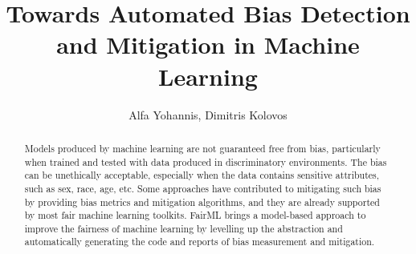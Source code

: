 \documentclass[final,5p,times,twocolumn]{elsarticle}
\begin{document}
\begin{frontmatter}



\title{Towards Automated Bias Detection and Mitigation in Machine Learning}


\author{Alfa Yohannis, Dimitris Kolovos}


\begin{abstract}
Models produced by machine learning are not guaranteed free from bias, particularly when trained and tested with data produced in discriminatory environments. The bias can be unethically acceptable, especially when the data contains sensitive attributes, such as sex, race, age, etc. Some approaches have contributed to mitigating such bias by providing bias metrics and mitigation algorithms, and they are already supported by most fair machine learning toolkits. FairML brings a model-based approach to improve the fairness of machine learning by levelling up the abstraction and automatically generating the code and reports of bias measurement and mitigation.
\end{abstract}


\end{frontmatter}
\end{document}

